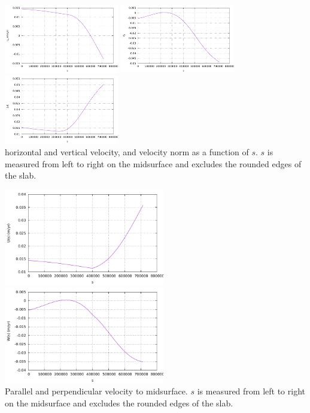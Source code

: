 \begin{center}
\includegraphics[width=5cm]{python_codes/fieldstone_55/images/spine_u}
\includegraphics[width=5cm]{python_codes/fieldstone_55/images/spine_v}
\includegraphics[width=5cm]{python_codes/fieldstone_55/images/spine_vel}\\
{\scriptsize horizontal and vertical velocity, and velocity norm as a function 
of $s$. $s$ is measured from 
left to right on the midsurface and excludes the rounded edges of the slab.}
\end{center}




\begin{center}
\includegraphics[width=7cm]{python_codes/fieldstone_55/images/spine_Us}
\includegraphics[width=7cm]{python_codes/fieldstone_55/images/spine_Ws}\\
{\scriptsize Parallel and perpendicular velocity to midsurface. $s$ is measured from 
left to right on the midsurface and excludes the rounded edges of the slab.}
\end{center}


